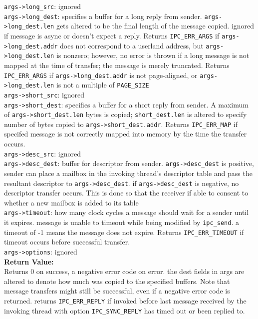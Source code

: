 \documentclass{article}
\begin{document}
 \verb|args->long_src|: ignored \\
 
 \verb|args->long_dest|: specifies a buffer for a long reply from sender.
 \verb|args->long_dest.len| gets altered to be the final length of the message copied.  ignored if message is async or doesn't expect a reply.  Returns \verb|IPC_ERR_ARGS| if
 \verb|args->long_dest.addr|  does not correspond to a userland address, but
 \verb|args->long_dest.len| is nonzero; however, no error is thrown if a long
 message is not mapped at the time of transfer; the message is merely
  truncated.  Returns \verb|IPC_ERR_ARGS| if \verb|args->long_dest.addr| is not
 page-aligned, or \verb|args->long_dest.len| is not a multiple of \verb|PAGE_SIZE| \\
 
 \verb|args->short_src|: ignored \\
 
 \verb|args->short_dest|: specifies a buffer for a short reply from sender. A maximum of 
 \verb|args->short_dest.len| bytes is copied; \verb|short_dest.len| is altered to specify number of bytes copied to \verb|args->short_dest.addr|.  Returns \verb|IPC_ERR_MAP| if specifed message is not correctly mapped into memory by the time the transfer occurs.\\
 
 \verb|args->desc_src|: ignored \\
 
 \verb|args->desc_dest|: buffer for descriptor from sender.  \verb|args->desc_dest| is
 positive, sender can place a mailbox in the invoking thread's descriptor table and pass the resultant descriptor to \verb|args->desc_dest|.  if \verb|args->desc_dest| is negative, no descriptor transfer occurs.  This is done so that the receiver if able to
 consent to whether a new mailbox is added to its table \\
 
 \verb|args->timeout|: how many clock cycles a message should wait for a sender
     until it expires.  message is unable to timeout while being modified by
     \verb|ipc_send|.  a timeout of -1 means the message does not expire.
     Returns \verb|IPC_ERR_TIMEOUT| if timeout occurs before successful transfer. \\
 
  \verb|args->options|: ignored\\

\textbf{Return Value:}\\
Returns 0 on success, a negative error code on error.  the dest fields in
  args are altered to denote how much was copied to the specified buffers.
  Note that message transfers might still be successful, even if a negative
  error code is returned.  returns \verb|IPC_ERR_REPLY| if invoked before last message
  received by the invoking thread with option \verb|IPC_SYNC_REPLY| has timed out or
  been replied to.
\end{document}
